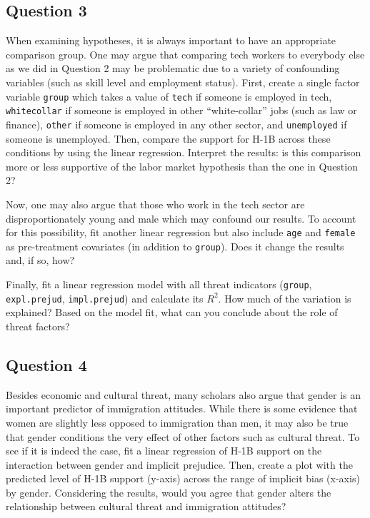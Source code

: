 \documentclass[]{article}
\begin{document}
\subsection{Question 3}\label{question-3}

When examining hypotheses, it is always important to have an appropriate
comparison group. One may argue that comparing tech workers to everybody
else as we did in Question 2 may be problematic due to a variety of
confounding variables (such as skill level and employment status).
First, create a single factor variable \texttt{group} which takes a
value of \texttt{tech} if someone is employed in tech,
\texttt{whitecollar} if someone is employed in other ``white-collar''
jobs (such as law or finance), \texttt{other} if someone is employed in
any other sector, and \texttt{unemployed} if someone is unemployed.
Then, compare the support for H-1B across these conditions by using the
linear regression. Interpret the results: is this comparison more or
less supportive of the labor market hypothesis than the one in Question
2?

Now, one may also argue that those who work in the tech sector are
disproportionately young and male which may confound our results. To
account for this possibility, fit another linear regression but also
include \texttt{age} and \texttt{female} as pre-treatment covariates (in
addition to \texttt{group}). Does it change the results and, if so, how?

Finally, fit a linear regression model with all threat indicators
(\texttt{group}, \texttt{expl.prejud}, \texttt{impl.prejud}) and
calculate its $R^2$. How much of the variation is explained? Based on
the model fit, what can you conclude about the role of threat factors?

\subsection{Question 4}\label{question-4}

Besides economic and cultural threat, many scholars also argue that
gender is an important predictor of immigration attitudes. While there
is some evidence that women are slightly less opposed to immigration
than men, it may also be true that gender conditions the very effect of
other factors such as cultural threat. To see if it is indeed the case,
fit a linear regression of H-1B support on the interaction between
gender and implicit prejudice. Then, create a plot with the predicted
level of H-1B support (y-axis) across the range of implicit bias
(x-axis) by gender. Considering the results, would you agree that gender
alters the relationship between cultural threat and immigration
attitudes?
\end{document}
